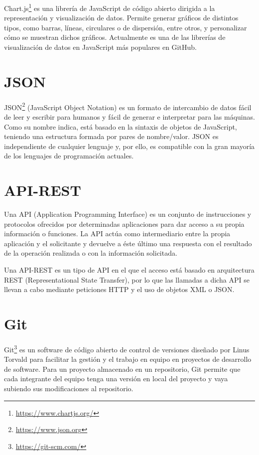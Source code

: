 \documentclass[a4paper, 12pt]{book}
\begin{document}
Chart.js\footnote{\url{https://www.chartjs.org/}} es una librería de JavaScript de código abierto dirigida a la representación y visualización de datos. Permite generar gráficos de distintos tipos, como barras, líneas, circulares o de dispersión, entre otros, y personalizar cómo se muestran dichos gráficos.
Actualmente es una de las librerías de visualización de datos en JavaScript más populares en GitHub.

\section{JSON} 
\label{sec:json}

JSON\footnote{\url{https://www.json.org}} (JavaScript Object Notation) es un formato de intercambio de datos fácil de leer y escribir para humanos y fácil de generar e interpretar para las máquinas. Como su nombre indica, está basado en la sintaxis de objetos de JavaScript, teniendo una estructura formada por pares de nombre/valor.
JSON es independiente de cualquier lenguaje y, por ello, es compatible con la gran mayoría de los lenguajes de programación actuales.

\section{API-REST} 
\label{sec:api}

Una API (Application Programming Interface) es un conjunto de instrucciones y protocolos ofrecidos por determinadas aplicaciones para dar acceso a su propia información o funciones. La API actúa como intermediario entre la propia aplicación y el solicitante y devuelve a éste último una respuesta con el resultado de la operación realizada o con la información solicitada.

Una API-REST es un tipo de API en el que el acceso está basado en arquitectura REST (Representational State Transfer), por lo que las llamadas a dicha API se llevan a cabo mediante peticiones HTTP y el uso de objetos XML o JSON.

\section{Git} 
\label{sec:git}

Git\footnote{\url{https://git-scm.com/}} es un software de código abierto de control de versiones diseñado por Linus Torvald para facilitar la gestión y el trabajo en equipo en proyectos de desarrollo de software.
Para un proyecto almacenado en un repositorio, Git permite que cada integrante del equipo tenga una versión en local del proyecto y vaya subiendo sus modificaciones al repositorio.
\end{document}
